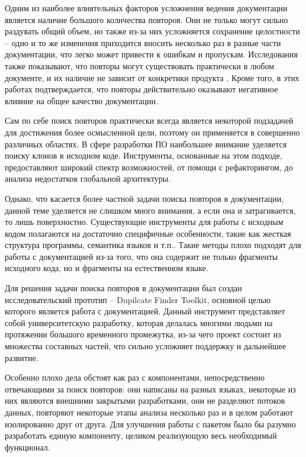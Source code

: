 \documentclass[14pt]{matmex-diploma-custom}
\begin{document}
Одним из наиболее влиятельных факторов усложнения ведения документации является наличие большого количества повторов. Они не только могут сильно раздувать общий объем, но также из-за них усложняется сохранение целостности -- одно и то же изменения приходится вносить несколько раз в разные части документации, что легко может привести к ошибкам и пропускам. Исследования также показывают, что повторы могут существовать практически в любом документе, и их наличие не зависит от конкретики продукта \cite{bib:art:JuergensCloneDetect, bib:art:DuplicatesStudy}. Кроме того, в этих работах подтверждается, что повторы действительно оказывают негативное влияние на общее качество документации.

Сам по себе поиск повторов практически всегда является некоторой подзадачей для достижения более осмысленной цели, поэтому он применяется в совершенно различных областях\cite{bib:art:NearDupSurvey}. В сфере разработки ПО наибольшее внимание уделяется поиску клонов в исходном коде\cite{bib:art:SoftwareClonesSurvey}. Инструменты, основанные на этом подходе, предоставляют широкий спектр возможностей, от помощи с рефакторингом, до анализа недостатков глобальной архитектуры.

Однако, что касается более частной задачи поиска повторов в документации, данной теме уделяется не слишком много внимания, а если она и затрагивается, то лишь поверхностно. Существующие инструменты для работы с исходным кодом полагаются на достаточно специфичные особенности, такие как жесткая структура программы, семантика языков и т.п.\cite{bib:tool:ASTSearch, bib:tool:ASTRefactor, bib:tool:ASTSuffix}. Такие методы плохо подходят для работы с документацией из-за того, что она содержит не только фрагменты исходного кода, но и фрагменты на естественном языке.

Для решения задачи поиска повторов в документации был создан исследовательский прототип -- Dupilcate Finder Toolkit\cite{bib:tool:DuplicateFinder}, основной целью которого является работа с документацией. Данный инструмент представляет собой университетскую разработку, которая делалась многими людьми на протяжении большого временного промежутка, из-за чего проект состоит из множества составных частей, что сильно усложняет поддержку и дальнейшее развитие.

Особенно плохо дела обстоят как раз с компонентами, непосредственно отвечающими за поиск повторов\cite{bib:tool:CloneMiner, bib:tool:FuzzySearch, bib:tool:ImprovedNgramSearch}: они написаны на разных языках, некоторые из них являются внешними закрытыми разработками, они не разделяют потоков данных, повторяют некоторые этапы анализа несколько раз и в целом работают изолированно друг от друга. Для улучшения работы с пакетом было бы разумно разработать единую компоненту, целиком реализующую весь необходимый функционал.
\end{document}
